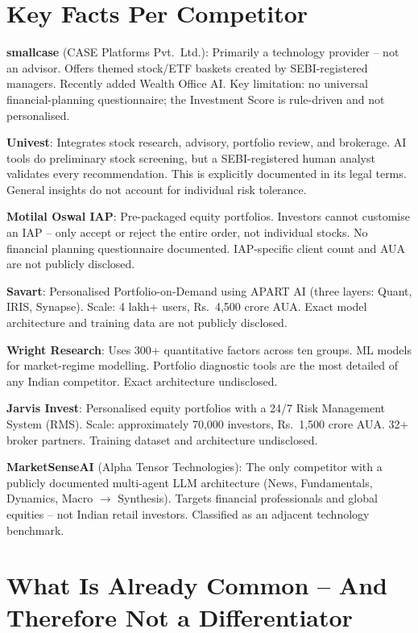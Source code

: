 \documentclass[12pt, a4paper, openany, oneside]{report}
\newcommand{\rupee}{Rs.~}
\begin{document}
\section{Key Facts Per Competitor}

\textbf{smallcase} (CASE Platforms Pvt.\ Ltd.): Primarily a technology provider -- not an advisor. Offers themed stock/ETF baskets created by SEBI-registered managers. Recently added Wealth Office AI. Key limitation: no universal financial-planning questionnaire; the Investment Score is rule-driven and not personalised.

\textbf{Univest}: Integrates stock research, advisory, portfolio review, and brokerage. AI tools do preliminary stock screening, but a SEBI-registered human analyst validates every recommendation. This is explicitly documented in its legal terms. General insights do not account for individual risk tolerance.

\textbf{Motilal Oswal IAP}: Pre-packaged equity portfolios. Investors cannot customise an IAP -- only accept or reject the entire order, not individual stocks. No financial planning questionnaire documented. IAP-specific client count and AUA are not publicly disclosed.

\textbf{Savart}: Personalised Portfolio-on-Demand using APART AI (three layers: Quant, IRIS, Synapse). Scale: 4 lakh+ users, \rupee4,500 crore AUA. Exact model architecture and training data are not publicly disclosed.

\textbf{Wright Research}: Uses 300+ quantitative factors across ten groups. ML models for market-regime modelling. Portfolio diagnostic tools are the most detailed of any Indian competitor. Exact architecture undisclosed.

\textbf{Jarvis Invest}: Personalised equity portfolios with a 24/7 Risk Management System (RMS). Scale: approximately 70,000 investors, \rupee1,500 crore AUA. 32+ broker partners. Training dataset and architecture undisclosed.

\textbf{MarketSenseAI} (Alpha Tensor Technologies): The only competitor with a publicly documented multi-agent LLM architecture (News, Fundamentals, Dynamics, Macro $\rightarrow$ Synthesis). Targets financial professionals and global equities -- not Indian retail investors. Classified as an adjacent technology benchmark.

\section{What Is Already Common -- And Therefore Not a Differentiator}
\end{document}
